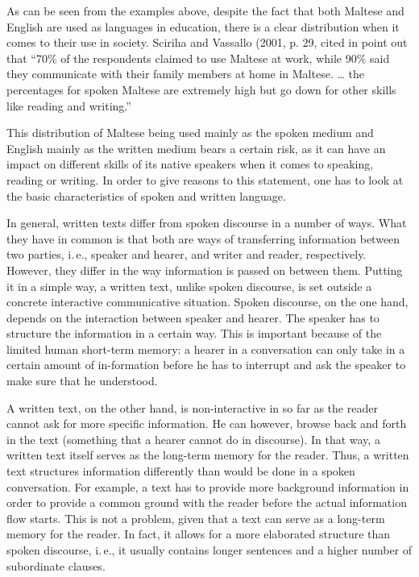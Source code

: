 \documentclass[]{../../metanetpaper}
\begin{document}
\begin{multicols}{2}
As can be seen from the examples above, despite the fact that both Maltese and English are used as languages in education, there is a clear distribution when it comes to their use in society. Sciriha and Vassallo (2001, p. 29, cited in \cite{Fabri:2011a} point out that ``70\% of the respondents claimed to use Maltese at work, while 90\% said they communicate with their family members at home in Maltese. … the percentages for spoken Maltese are extremely high but go down for other skills like reading and writing.''

This distribution of Maltese being used mainly as the spoken medium and English mainly as the written medium bears a certain risk, as it can have an impact on different skills of its native speakers when it comes to speaking, reading or writing. In order to give reasons to this statement, one has to look at the basic characteristics of spoken and written language.

In general, written texts differ from spoken discourse in a number of ways. What they have in common is that both are ways of transferring information between two parties, i.\,e., speaker and hearer, and writer and reader, respectively. However, they differ in the way information is passed on between them. Putting it in a simple way, a written text, unlike spoken discourse, is set outside a concrete interactive communicative situation. Spoken discourse, on the one hand, depends on the interaction between speaker and hearer. The speaker has to structure the information in a certain way. This is important because of the limited human short-term memory: a hearer in a conversation can only take in a certain amount of in-formation before he has to interrupt and ask the speaker to make sure that he understood. 

A written text, on the other hand, is non-interactive in so far as the reader cannot ask for more specific information. He can however, browse back and forth in the text (something that a hearer cannot do in discourse). In that way, a written text itself serves as the long-term memory for the reader. Thus, a written text structures information differently than would be done in a spoken conversation. For example, a text has to provide more background information in order to provide a common ground with the reader before the actual information flow starts. This is not a problem, given that a text can serve as a long-term memory for the reader. In fact, it allows for a more elaborated structure than spoken discourse, i.\,e., it usually contains longer sentences and a higher number of subordinate clauses. 


\end{multicols}
\end{document}
